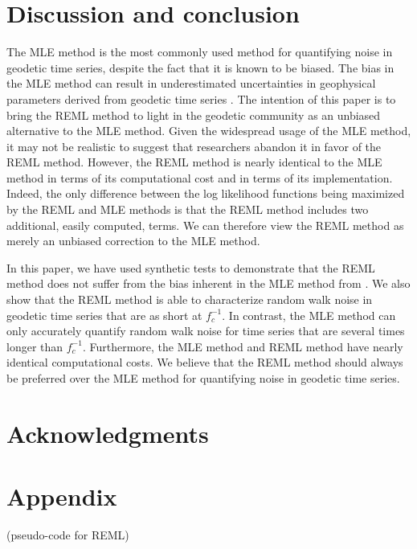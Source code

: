 \documentclass[10pt,a4paper]{article}
\begin{document}
\section{Discussion and conclusion}

The MLE method is the most commonly used method for quantifying noise in geodetic time series, despite the fact that it is known to be biased. The bias in the MLE method can result in underestimated uncertainties in geophysical parameters derived from geodetic time series \citep{Langbein2012}. The intention of this paper is to bring the REML method to light in the geodetic community as an unbiased alternative to the MLE method. Given the widespread usage of the MLE method, it may not be realistic to suggest that researchers abandon it in favor of the REML method.  However, the REML method is nearly identical to the MLE method in terms of its computational cost and in terms of its implementation. Indeed, the only difference between the log likelihood functions being maximized by the REML and MLE methods is that the REML method includes two additional, easily computed, terms. We can therefore view the REML method as merely an unbiased correction to the MLE method.     

In this paper, we have used synthetic tests to demonstrate that the REML method does not suffer from the bias inherent in the MLE method from \citet{Langbein1997}. We also show that the REML method is able to characterize random walk noise in geodetic time series that are as short at $f_c^{-1}$. In contrast, the MLE method can only accurately quantify random walk noise for time series that are several times longer than $f_c^{-1}$. Furthermore, the MLE method and REML method have nearly identical computational costs. We believe that the REML method should always be preferred over the MLE method for quantifying noise in geodetic time series.      

\section{Acknowledgments}

\section{Appendix}
(pseudo-code for REML)


  
\end{document}
